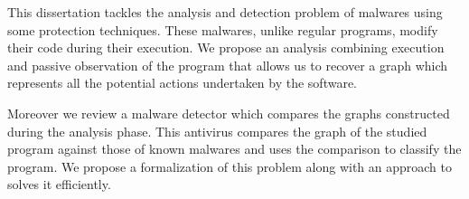 This dissertation tackles the analysis and detection problem of malwares using some protection techniques.
These malwares, unlike regular programs, modify their code during their execution.
We propose an analysis combining execution and passive observation of the program that allows us to recover a graph which represents all the potential actions undertaken by the software.

Moreover we review a malware detector which compares the graphs constructed during the analysis phase. 
This antivirus compares the graph of the studied program against those of known malwares and uses the comparison to classify the program.
We propose a formalization of this problem along with an approach to solves it efficiently.